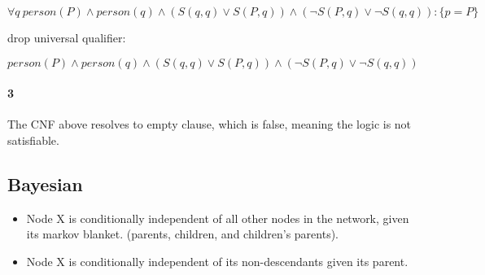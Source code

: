 \begin{equation}
  \forall q \: person(P) \wedge person(q) \wedge (S(q,q) \vee S(P,q)) \wedge (\neg S(P,q) \vee \neg S(q,q)) : \{p={P}\}
\end{equation}

drop universal qualifier:

\begin{equation}
  person(P) \wedge person(q) \wedge (S(q,q) \vee S(P,q)) \wedge (\neg S(P,q) \vee \neg S(q,q))
\end{equation}

\paragraph{3}

The CNF above resolves to empty clause, which is false, meaning the logic is not satisfiable.


\subsection{Bayesian}
\begin{itemize}
\item  Node X is conditionally independent of all other nodes in the
  network, given its markov blanket. (parents, children, and
  children's parents).
\item  Node X is conditionally independent of its non-descendants given its
  parent.
\end{itemize}

